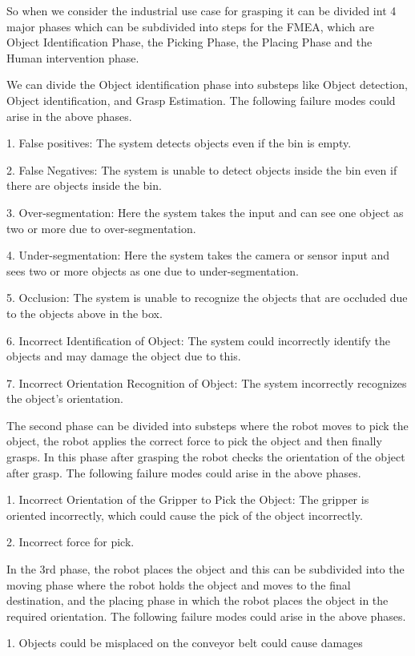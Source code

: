 {So when we consider the industrial use case for grasping it can be divided int 4 major phases which can be subdivided into steps for the FMEA, which are Object Identification Phase, the Picking Phase, the Placing Phase and the Human intervention phase.

We can divide the  Object identification phase into substeps like Object detection, Object identification, and Grasp Estimation.
The following failure modes could arise in the above phases.

1. False positives: The system detects objects even if the bin is empty.

2. False Negatives:  The system is unable to detect objects inside the bin even if there are objects inside the bin.

3. Over-segmentation: Here the system takes the input and can see one object as two or more due to over-segmentation.

4. Under-segmentation: Here the system takes the camera or sensor input and sees two or more objects as one due to under-segmentation.

5. Occlusion: The system is unable to recognize the objects that are occluded due to the objects above in the box.

6. Incorrect Identification of Object: The system could incorrectly identify the objects and may damage the object due to this.

7. Incorrect Orientation Recognition of Object: The system incorrectly recognizes the object's orientation.


The second phase can be divided into substeps where the robot moves to pick the object, the robot applies the correct force to pick the object and then finally grasps. In this phase after grasping the robot checks the orientation of the object after grasp.
The following failure modes could arise in the above phases.

1. Incorrect Orientation of the Gripper to Pick the Object: The gripper is oriented incorrectly, which could cause the pick of the object incorrectly.

2. Incorrect force for pick.

In the 3rd phase, the robot places the object and this can be subdivided into the moving phase where the robot holds the object and moves to the final destination, and the placing phase in which the robot places the object in the required orientation.
The following failure modes could arise in the above phases.

1. Objects could be misplaced on the conveyor belt could cause damages

}
